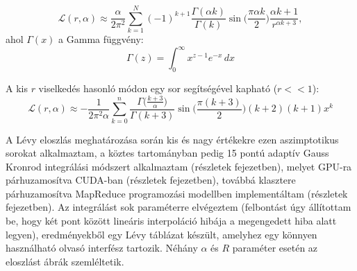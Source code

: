 \documentclass[11pt,a4paper]{article}
\numberwithin{equation}{subsection}
\numberwithin{figure}{section}
\begin{document}
\begin{equation}
\mathcal{L}(r,\alpha) \approx \frac{\alpha}{2\pi^2}\sum_{k=1}^{N}(-1)^{k+1}\frac{\Gamma(\alpha k)}{\Gamma(k)} \sin{\bigg(\frac{\pi\alpha k}{2}\bigg)}\frac{\alpha k+1}{r^{\alpha k+3}},
\end{equation}
ahol $\Gamma(x)$ a Gamma függvény:
\begin{equation}
 \Gamma (z)=\int _{0}^{\infty }x^{z-1}e^{-x}\,dx
 \label{eq:gamma}
\end{equation}

A kis $r$ viselkedés hasonló módon egy sor segítségével kapható ($r<<1$):
\begin{equation}
\mathcal{L}(r,\alpha) \approx -\frac{1}{2\pi^2\alpha}\sum_{k=0}^n\frac{\Gamma\big(\frac{k+3}{\alpha}\big)}{\Gamma(k+3)}\sin{\bigg(\frac{\pi(k+3)}{2}\bigg)}(k+2)(k+1)x^k
\end{equation} 

A Lévy eloszlás meghatározása során kis és nagy értékekre ezen aszimptotikus sorokat alkalmaztam, a köztes tartományban pedig 15 pontú adaptív Gauss Kronrod integrálási módszert alkalmaztam (részletek  fejezetben), melyet GPU-ra párhuzamosítva CUDA-ban (részletek  fejezetben), továbbá klasztere párhuzamosítva MapReduce programozási modellben implementáltam (részletek  fejezetben). Az integrálást sok paraméterre elvégeztem (felbontást úgy állítottam be, hogy két pont között lineáris interpoláció hibája a megengedett hiba alatt legyen), eredményekből egy Lévy táblázat készült, amelyhez egy könnyen használható olvasó interfész tartozik. Néhány $\alpha$ és $R$ paraméter esetén az eloszlást  ábrák szemléltetik.
\end{document}
